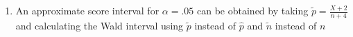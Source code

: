 \documentclass[12pt]{article}
\begin{document}
\begin{enumerate}[1.]
\begin{eqnarray*}
{  \right]}.
\end{eqnarray*}
\item An approximate score interval for $\alpha = .05$ can be obtained by taking
  $\tilde p = \frac{X + 2}{n + 4}$ and calculating the Wald interval using $\tilde p$
  instead of $\hat p$ and $\tilde n$ instead of $n$
\end{enumerate}
\end{document}
